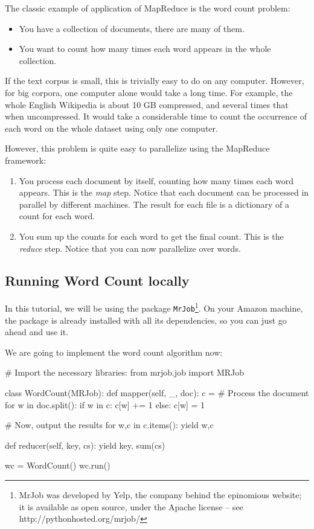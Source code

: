 The classic example of application of MapReduce is the word count problem:

\begin{itemize}
\item You have a collection of documents, there are many of them.
\item You want to count how many times each word appears in the whole collection.
\end{itemize}

If the text corpus is small, this is trivially easy to do on any computer. However, for big corpora, one computer alone would take a long time. For example, the whole English Wikipedia is about 10 GB compressed, and several times that when uncompressed. It would take a considerable time to count the occurrence of each word on the whole dataset using only one computer.

However, this problem is quite easy to parallelize using the MapReduce framework:

\begin{enumerate}
\item You process each document by itself, counting how many times each word
appears. This is the \emph{map} step. Notice that each document can be
processed in parallel by different machines. The result for each file is a
dictionary of a count for each word.
\item You sum up the counts for each word to get the final count. This is the
\emph{reduce} step. Notice that you can now parallelize over words.
\end{enumerate}

\subsection{Running Word Count locally}

In this tutorial, we will be using the package \texttt{MrJob}\footnote{MrJob was developed by Yelp, the company behind the epinomious website; it is available
as open source, under the Apache license -- see http://pythonhosted.org/mrjob/}. On your Amazon machine, the package
is already installed with all its dependencies, so you can just go ahead and
use it.

We are going to implement the word count algorithm now:

\begin{python}
# Import the necessary libraries:
from mrjob.job import MRJob

class WordCount(MRJob):
    def mapper(self, _, doc):
        c = {}
        # Process the document
        for w in doc.split():
            if w in c:
                c[w] += 1
            else:
                c[w] = 1

        # Now, output the results
        for w,c in c.items():
            yield w,c

    def reducer(self, key, cs):
        yield key, sum(cs)

wc = WordCount()
wc.run()
\end{python}

